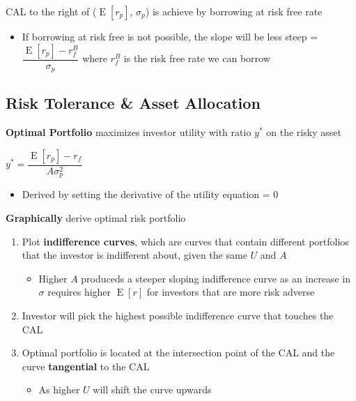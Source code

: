 \documentclass[]{book}
\providecommand{\tightlist}{%
  \setlength{\itemsep}{0pt}\setlength{\parskip}{0pt}}
\theoremstyle{definition}
\theoremstyle{definition}
\theoremstyle{remark}
\begin{document}
CAL to the right of (\(\operatorname{E}[r_p]\), \(\sigma_p\)) is achieve
by borrowing at risk free rate

\begin{itemize}
\tightlist
\item
  If borrowing at risk free is not possible, the slope will be less
  steep = \(\dfrac{\operatorname{E}[r_p] - r_f^B}{\sigma_p}\) where
  \(r_f^B\) is the risk free rate we can borrow
\end{itemize}

\subsection{Risk Tolerance \& Asset
Allocation}\label{risk-tolerance-asset-allocation}

\textbf{Optimal Portfolio} maximizes investor utility with ratio \(y^*\)
on the risky asset

\(y^* = \dfrac{\operatorname{E}[r_p] - r_f}{A\sigma^2_p}\)

\begin{itemize}
\tightlist
\item
  Derived by setting the derivative of the utility equation = 0
\end{itemize}

 \textbf{Graphically} derive optimal risk portfolio

\begin{enumerate}
\def\labelenumi{\arabic{enumi})}
\item
  Plot \textbf{indifference curves}, which are curves that contain
  different portfolios that the investor is indifferent about, given the
  same \(U\) and \(A\)

  \begin{itemize}
  \tightlist
  \item
    Higher \(A\) produceds a steeper sloping indifference curve as an
    increase in \(\sigma\) requires higher \(\operatorname{E}[r]\) for
    investors that are more risk adverse
  \end{itemize}
\item
  Investor will pick the highest possible indifference curve that
  touches the CAL
\item
  Optimal portfolio is located at the intersection point of the CAL and
  the curve \textbf{tangential} to the CAL

  \begin{itemize}
  \tightlist
  \item
    As higher \(U\) will shift the curve upwards
  \end{itemize}
\end{enumerate}
\end{document}

